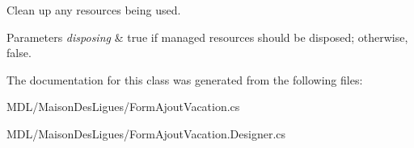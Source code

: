 Clean up any resources being used. 


\begin{DoxyParams}{Parameters}
{\em disposing} & true if managed resources should be disposed; otherwise, false.\\
\hline
\end{DoxyParams}


The documentation for this class was generated from the following files\+:\begin{DoxyCompactItemize}
\item 
M\+D\+L/\+Maison\+Des\+Ligues/Form\+Ajout\+Vacation.\+cs\item 
M\+D\+L/\+Maison\+Des\+Ligues/Form\+Ajout\+Vacation.\+Designer.\+cs\end{DoxyCompactItemize}
